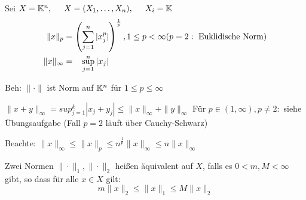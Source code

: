 \begin{beispiel}
Sei $ X = \mathbb{K}^{n}, \hspace{0.5cm} X = ( X_{1}, \dotsc, X_{n}), \hspace{0.5cm} X_{i} = \mathbb{K}$ 
\begin{align*}
	\| x \|_{p} & = \left( \sum_{j = 1}^{n} |x_{j}^{p}| \right)^{\frac{1}{p}},  1 \leq p < \infty (p = 2: \text{ Euklidische Norm}) \\
	\| x \|_{\infty} & = \hspace{0.3cm} \sup_{j = 1}^{n} |x_{j}|	
\end{align*}

Beh: $\| \cdot \| $ ist Norm auf $\mathbb{K}^n$ für $1 \leq p \leq \infty$

$\| x + y \|_{\infty} = sup_{j = 1}^{k} |x_{j} + y_{j}| \leq \|x\|_{\infty} + \|y\|_{\infty} $
Für $p \in (1, \infty), p \neq 2:$ siehe Übungsaufgabe (Fall $p = 2$ läuft über Cauchy-Schwarz)

Beachte: $\|x\|_{\infty} \leq  \|x\|_{p} \leq n^{\frac{1}{p}} \|x\|_{\infty} \leq n \| x \|_{\infty}$
\end{beispiel}

\begin{definition}
	Zwei Normen $\| \cdot \|_{1}, \| \cdot \|_{2}$ heißen äquivalent auf $X$, falls es $0 < m, M < \infty$ gibt, so dass für alle $ x \in X$ gilt:
	\[ m \| x \|_{2} \leq \| x \|_{1} \leq M \| x \|_{2} \]
\end{definition}
 

